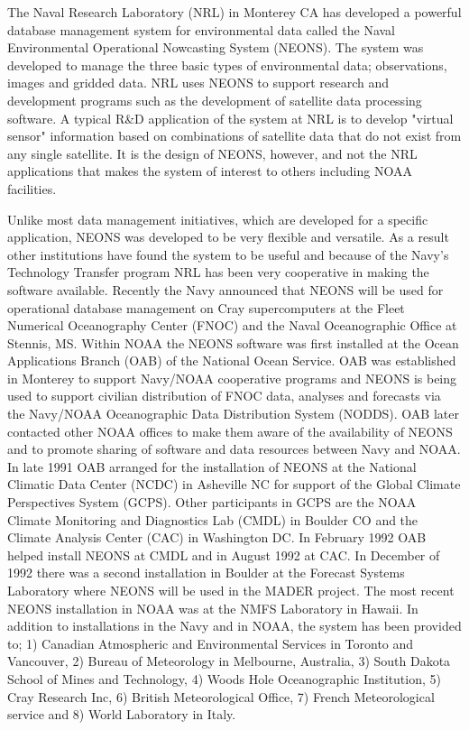 \medskip
\large
{}
\normalsize
\bigskip

\bigskip

	The Naval Research Laboratory (NRL) in Monterey CA has developed a 
powerful database management system for environmental data called the 
Naval Environmental Operational Nowcasting System (NEONS).  The system 
was developed to manage the three basic types of environmental data; 
observations, images and gridded data.  NRL uses NEONS to support 
research and development programs such as the development of satellite 
data processing software.  A typical R\&D application of the system at NRL 
is to develop "virtual sensor" information based on combinations of 
satellite data that do not exist from any single satellite.  It is the design 
of NEONS, however, and not the NRL applications that makes the system of 
interest to others including NOAA facilities.

	Unlike most data management initiatives, which are developed for a 
specific application, NEONS was developed to be very flexible and 
versatile.  As a result other institutions have found the system to be 
useful and because of the Navy's Technology Transfer program NRL has 
been very cooperative in making the software available.  Recently the Navy 
announced that NEONS will be used for operational database management 
on Cray supercomputers at the Fleet Numerical Oceanography Center 
(FNOC) and the Naval Oceanographic Office at Stennis, MS.  Within NOAA 
the NEONS software was first installed at the Ocean Applications Branch 
(OAB) of the National Ocean Service.  OAB was established in Monterey to 
support Navy/NOAA cooperative programs and NEONS is being used to 
support civilian distribution of FNOC data, analyses and forecasts via the 
Navy/NOAA Oceanographic Data Distribution System (NODDS).  OAB later 
contacted other NOAA offices to make them aware of the availability of 
NEONS and to promote sharing of software and data resources between 
Navy and NOAA.  In late 1991 OAB arranged for the installation of NEONS 
at the National Climatic Data Center (NCDC) in Asheville NC for support of 
the Global Climate Perspectives System (GCPS).  Other participants in 
GCPS are the NOAA Climate Monitoring and Diagnostics Lab (CMDL) in 
Boulder CO and the Climate Analysis Center (CAC) in Washington DC.  In 
February 1992 OAB helped install NEONS at CMDL and in August 1992 at 
CAC.  In December of 1992 there was a second installation in Boulder at 
the
Forecast Systems Laboratory where NEONS will be used in the MADER 
project.  The most recent NEONS installation in NOAA was at the NMFS 
Laboratory in Hawaii.  In addition to installations in the Navy and in NOAA, 
the system has been provided to; 1) Canadian Atmospheric and 
Environmental Services in Toronto and Vancouver, 2) Bureau of 
Meteorology in Melbourne, Australia, 3) South Dakota School of Mines and 
Technology, 4) Woods Hole Oceanographic Institution, 5) Cray Research 
Inc, 6) British Meteorological Office, 7) French Meteorological service and 
8) World Laboratory in Italy.  
 
